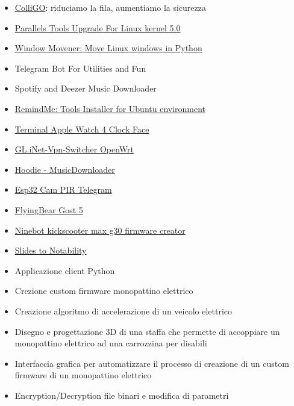 \documentclass[10pt,a4paper]{altacv}
\begin{document}
\begin{itemize}
    \item \href{https://github.com/andreavitaletti/ColliGo}{ColliGO}: riduciamo la fila, aumentiamo la sicurezza
	\item \href{https://github.com/LucaTomei/Parallels-Tools-Linux-kernel-5.0}{Parallels Tools Upgrade For Linux kernel 5.0}
	\item \href{https://github.com/LucaTomei/Window_Movener}{Window Movener: Move Linux windows in Python}
	\item Telegram Bot For Utilities and Fun
	\item Spotify and Deezer Music Downloader 
	\item \href{https://github.com/LucaTomei/RemindMe}{RemindMe: Tools Installer for Ubuntu environment}
	\item \href{https://github.com/LucaTomei/Terminal-Apple-Watch-4-Clock-Face-}{Terminal Apple Watch 4 Clock Face}
	\item \href{https://github.com/LucaTomei/GL.iNet-VpnSwitcher-OpenWrt}{GL.iNet-Vpn-Switcher OpenWrt}
	\item \href{https://github.com/LucaTomei/Hoodie-MusicDownloader}{Hoodie - MusicDownloader}
	\item \href{https://github.com/LucaTomei/Esp32-Cam-PIR-Telegram}{Esp32 Cam PIR Telegram}
	\item \href{https://github.com/LucaTomei/FlyingBear-Gost-5}{FlyingBear Gost 5}
	\item \href{https://github.com/LucaTomei/MAXG30CFW}{Ninebot kickscooter max g30 firmware creator}
	\item \href{https://github.com/LucaTomei/Slides_to_Notability}{Slides to Notability}
\end{itemize}



\begin{itemize}
\item Applicazione client Python
\item Crezione custom firmware monopattino elettrico
\item Creazione algoritmo di accelerazione di un veicolo elettrico
\item Disegno e progettazione 3D di una staffa che permette di accoppiare un monopattino elettrico ad una carrozzina per disabili
\item Interfaccia grafica per automatizzare il processo di creazione di un custom firmware di un monopattino elettrico
\item Encryption/Decryption file binari e modifica di parametri
\end{itemize}
\end{document}
